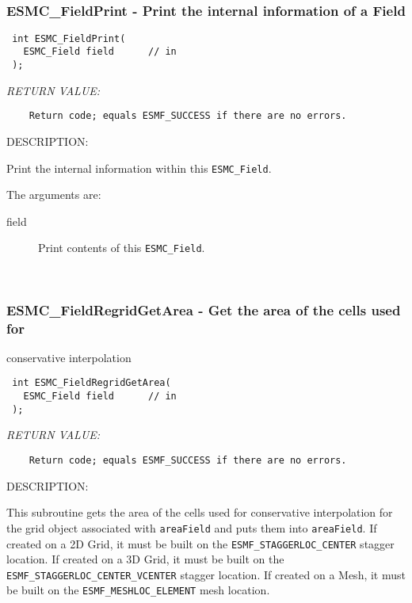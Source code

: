  
\mbox{}\hrulefill\ 
 
\subsubsection [ESMC\_FieldPrint] {ESMC\_FieldPrint - Print the internal information of a Field}


  
\begin{verbatim} int ESMC_FieldPrint(
   ESMC_Field field      // in
 );
 \end{verbatim}{\em RETURN VALUE:}
\begin{verbatim}    Return code; equals ESMF_SUCCESS if there are no errors.\end{verbatim}
{\sf DESCRIPTION:\\ }


  
    Print the internal information within this {\tt ESMC\_Field}.
  
    The arguments are:
    \begin{description}
    \item[field]
      Print contents of this {\tt ESMC\_Field}.
    \end{description}
   
 
\mbox{}\hrulefill\ 
 
\subsubsection [ESMC\_FieldRegridGetArea] {ESMC\_FieldRegridGetArea - Get the area of the cells used for }


                                        conservative interpolation
  
\begin{verbatim} int ESMC_FieldRegridGetArea(
   ESMC_Field field      // in
 );
 \end{verbatim}{\em RETURN VALUE:}
\begin{verbatim}    Return code; equals ESMF_SUCCESS if there are no errors.\end{verbatim}
{\sf DESCRIPTION:\\ }


       This subroutine gets the area of the cells used for conservative interpolation for the grid object 
       associated with {\tt areaField} and puts them into {\tt areaField}. If created on a 2D Grid, it must 
       be built on the {\tt ESMF\_STAGGERLOC\_CENTER} stagger location. 
       If created on a 3D Grid, it must be built on the {\tt ESMF\_STAGGERLOC\_CENTER\_VCENTER} stagger 
       location. If created on a Mesh, it must be built on the {\tt ESMF\_MESHLOC\_ELEMENT} mesh location. 
  
